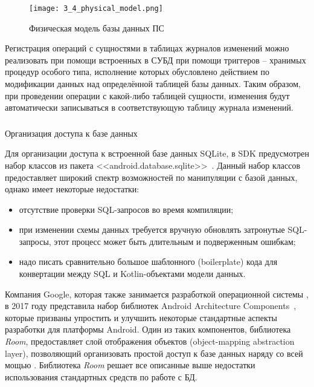 \begin{figure}[ht!]
    \centering
    \texttt{[image: 3\_4\_physical\_model.png]}
    \caption{Физическая модель базы данных ПС}
    \label{fig:design:database:model:diagram}
\end{figure}

Регистрация операций с сущностями в таблицах журналов изменений можно реализовать при помощи встроенных в СУБД \sqlite при помощи триггеров -- хранимых процедур особого типа, исполнение которых обусловлено действием по модификации данных над определённой таблицей базы данных.
Таким образом, при проведении операции с какой-либо таблицей сущности, изменения будут автоматически записываться в соответствующую таблицу журнала изменений.

\subsubsection{} Организация доступа к базе данных
\label{sec:design:database:implementation}

Для организации доступа к встроенной базе данных SQLite, в \andro SDK предусмотрен набор классов из пакета <<android.database.sqlite>>~\cite{android_sqlite}.
Данный набор классов предоставляет широкий спектр возможностей по манипуляции с базой данных, однако имеет некоторые недостатки:
\begin{itemize}
    \item отсутствие проверки SQL-запросов во время компиляции;
    \item при изменении схемы данных требуется вручную обновлять затронутые SQL-запросы, этот процесс может быть длительным и подверженным ошибкам;
    \item надо писать сравнительно большое шаблонного (boilerplate) кода для конвертации между SQL и Kotlin-объектами модели данных.
\end{itemize}

Компания Google, которая также занимается разработкой операционной системы \andro, в 2017 году представила набор библиотек Android Architecture Com\-po\-nents~\cite{android_components}, которые призваны упростить и улучшить некоторые стандартные аспекты разработки для платформы Android.
Один из таких компонентов, библиотека \emph{Room}, предоставляет слой отображения  объектов (object-mapping abstraction layer), позволяющий организовать простой доступ к базе данных наряду со всей мощью \sqlite.
Библиотека \emph{Room} решает все описанные выше недостатки использования стандартных средств по работе с БД.

